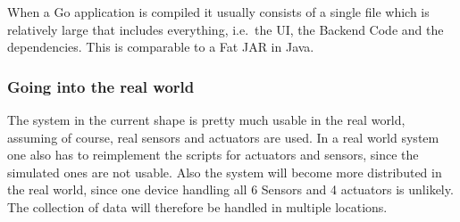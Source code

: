 When a Go application is compiled it usually consists of a single file
which is relatively large that includes everything, i.e.~the UI, the
Backend Code and the dependencies. This is comparable to a Fat JAR in
Java.


\subsubsection{Going into the real
world}\label{going-into-the-real-world}

The system in the current shape is pretty much usable in the real world,
assuming of course, real sensors and actuators are used. In a real world
system one also has to reimplement the scripts for actuators and
sensors, since the simulated ones are not usable. Also the system will
become more distributed in the real world, since one device handling all
6 Sensors and 4 actuators is unlikely. The collection of data will
therefore be handled in multiple locations.
